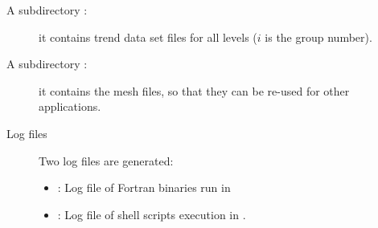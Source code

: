\begin{description}
\item[A subdirectory :] it contains trend data set files for all levels \linebreak {} ($i$ is the group number).


\item[A subdirectory :] it contains the mesh files, so that they can be re-used for other applications.

\item[Log files] Two log files are generated:
\begin{itemize}
\item {}: Log file of Fortran binaries run in 
\item {}: Log file of shell scripts execution in .
\end{itemize}

\end{description}

